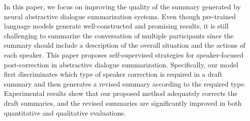 In this paper, we focus on improving the quality of the summary generated by neural abstractive dialogue summarization systems. Even though pre-trained language models generate well-constructed and promising results, it is still challenging to summarize the conversation of multiple participants since the summary should include a description of the overall situation and the actions of each speaker. This paper proposes self-supervised strategies for speaker-focused post-correction in abstractive dialogue summarization. Specifically, our model first discriminates which type of speaker correction is required in a draft summary and then generates a revised summary according to the required type. Experimental results show that our proposed method adequately corrects the draft summaries, and the revised summaries are significantly improved in both quantitative and qualitative evaluations.
